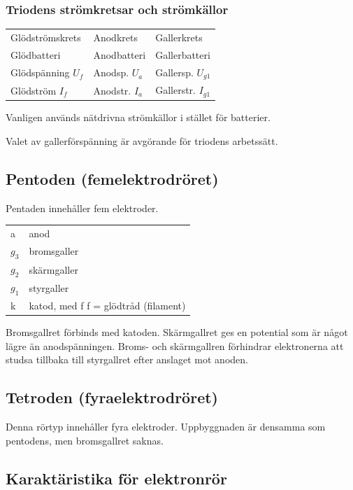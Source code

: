 \subsubsection{Triodens strömkretsar och strömkällor}

\begin{tabular}{lll}
Glödströmskrets      & Anodkrets        &  Gallerkrets \\
Glödbatteri          & Anodbatteri      &  Gallerbatteri \\
Glödspänning \(U_f\) & Anodsp. \(U_a\)  &  Gallersp. \(U_{g1}\) \\
Glödström \(I_f\)    & Anodstr. \(I_a\) &  Gallerstr. \(I_{g1}\) \\
\end{tabular}

Vanligen används nätdrivna strömkällor i stället för batterier.

Valet av gallerförspänning är avgörande för triodens arbetssätt.

\subsection{Pentoden (femelektrodröret)}

Pentaden innehåller fem elektroder.

\begin{tabular}{ll}
  a       & anod \\
  \(g_3\) & bromsgaller \\
  \(g_2\) & skärmgaller \\
  \(g_1\) & styrgaller \\
  k      & katod, med f f = glödtråd (filament) \\
\end{tabular}

Bromsgallret förbinds med katoden. Skärmgallret ges en potential som är något
lägre än anodspänningen. Broms- och skärmgallren förhindrar elektronerna att
studsa tillbaka till styrgallret efter anslaget mot anoden.


\subsection{Tetroden (fyraelektrodröret)}

Denna rörtyp innehåller fyra elektroder. Uppbyggnaden är densamma som pentodens,
men bromsgallret saknas.

\subsection{Karaktäristika för elektronrör}

